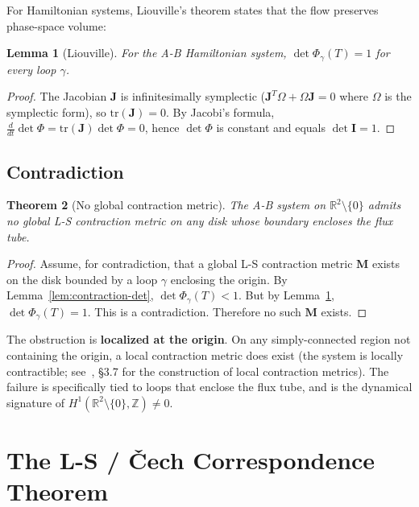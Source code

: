 \documentclass[11pt]{article}
\newtheorem{theorem}{Theorem}[section]
\newtheorem{lemma}[theorem]{Lemma}
\begin{document}
For Hamiltonian systems, Liouville's theorem states that the flow preserves
phase-space volume:

\begin{lemma}[Liouville]
\label{lem:liouville}
For the A-B Hamiltonian system, $\det\Phi_\gamma(T) = 1$ for every loop $\gamma$.
\end{lemma}

\begin{proof}
The Jacobian $\mathbf{J}$ is infinitesimally symplectic
($\mathbf{J}^T\Omega + \Omega\mathbf{J} = 0$ where $\Omega$ is the symplectic form),
so $\mathrm{tr}(\mathbf{J}) = 0$. By Jacobi's formula,
$\frac{d}{dt}\det\Phi = \mathrm{tr}(\mathbf{J})\det\Phi = 0$, hence $\det\Phi$ is
constant and equals $\det\mathbf{I} = 1$.
\end{proof}

\subsection{Contradiction}
\label{sec:contradiction}

\begin{theorem}[No global contraction metric]
\label{thm:no-global-M}
The A-B system on $\mathbb{R}^2 \setminus \{0\}$ admits no global L-S contraction
metric on any disk whose boundary encloses the flux tube.
\end{theorem}

\begin{proof}
Assume, for contradiction, that a global L-S contraction metric $\mathbf{M}$ exists
on the disk bounded by a loop $\gamma$ enclosing the origin. By Lemma~\ref{lem:contraction-det},
$\det\Phi_\gamma(T) < 1$. But by Lemma~\ref{lem:liouville}, $\det\Phi_\gamma(T) = 1$.
This is a contradiction. Therefore no such $\mathbf{M}$ exists.
\end{proof}

The obstruction is \textbf{localized at the origin}. On any simply-connected region
not containing the origin, a local contraction metric does exist (the system is
locally contractible; see~\cite{LohmillerSlotine1998}, \S3.7 for the construction
of local contraction metrics). The failure is specifically tied to loops that enclose the
flux tube, and is the dynamical signature of
$H^1(\mathbb{R}^2 \setminus \{0\}, \mathbb{Z}) \neq 0$.

\section{The L-S / \v{C}ech Correspondence Theorem}
\label{sec:correspondence}
\end{document}

